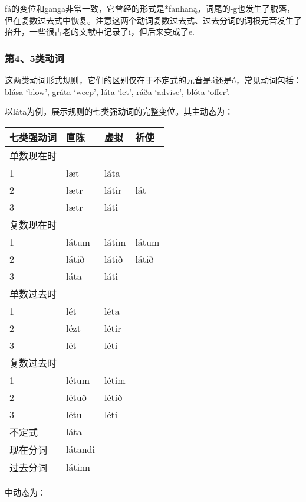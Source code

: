 fá的变位和ganga非常一致，它曾经的形式是*fanhaną，词尾的-g也发生了脱落，但在复数过去式中恢复。注意这两个动词复数过去式、过去分词的词根元音发生了抬升，一些很古老的文献中记录了i，但后来变成了e.

\subsubsection{第4、5类动词}

这两类动词形式规则，它们的区别仅在于不定式的元音是á还是ó，常见动词包括：blása `blow', gráta `weep', láta `let', ráða `advise', blóta `offer‌'.

以láta为例，展示规则的七类强动词的完整变位。其主动态为：

\begin{longtable}{llll}
    \toprule
    七类强动词 & 直陈      & 虚拟    & 祈使    \\
    \midrule
    \endhead
    \bottomrule
    \endfoot
    单数现在时 &         &       &       \\
    1     & læt     & láta  &       \\
    2     & lætr    & látir & lát   \\
    3     & lætr    & láti  &       \\
    复数现在时 &         &       &       \\
    1     & látum   & látim & látum \\
    2     & látið   & látið & látið \\
    3     & láta    & láti  &       \\
    单数过去时 &         &       &       \\
    1     & lét     & léta  &       \\
    2     & lézt    & létir &       \\
    3     & lét     & léti  &       \\
    复数过去时 &         &       &       \\
    1     & létum   & létim &       \\
    2     & létuð   & létið &       \\
    3     & létu    & léti  &       \\
    不定式   & láta    &       &       \\
    现在分词  & látandi &       &       \\
    过去分词  & látinn  &       &       \\
\end{longtable}

中动态为：


